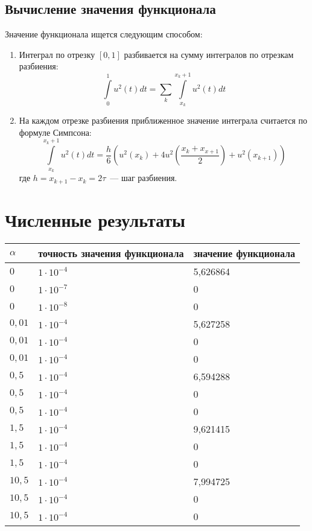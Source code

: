 \documentclass[24pt]{article}
\begin{document}
\subsection{Вычисление значения функционала}
Значение функционала ищется следующим способом:\\
\begin{enumerate}
\item 
Интеграл по отрезку $[0,1]$ разбивается на сумму интегралов по отрезкам разбиения:
$$ \int\limits_0^1 u^2(t) dt = \sum\limits_k\int\limits_{x_k}^{x_k+1}u^2(t)dt$$
\item
На каждом отрезке разбиения приближенное значение интеграла считается по формуле Симпсона:\\
$$\int\limits_{x_k}^{x_k+1}u^2(t)dt = \frac{h}{6}\left(u^2\left(x_k\right) + 4u^2\left(\frac{x_k + x_{x+1}}{2}\right)+u^2\left(x_{k+1}\right)\right)$$
где $h = x_{k+1}-x_{k} = 2\tau$~--- шаг разбиения.
\end{enumerate}
\section{Численные результаты}
\begin{tabular}[t]{||l|l|l||}
\hline
$\alpha$ & точность значения функционала & значение функционала\\
\hline\hline
$0$& $1\cdot 10^{-4}$ & 5{,}626864\\
\hline
$0$& $1\cdot 10^{-7}$ & 0\\
\hline
$0$& $1\cdot 10^{-8}$ & 0\\
\hline
$0{,}01$& $1\cdot 10^{-4}$ & 5{,}627258\\
\hline
$0{,}01$& $1\cdot 10^{-4}$ & 0\\
\hline
$0{,}01$& $1\cdot 10^{-4}$ & 0\\
\hline
$0{,}5$& $1\cdot 10^{-4}$ & 6{,}594288\\
\hline
$0{,}5$& $1\cdot 10^{-4}$ & 0\\
\hline
$0{,}5$& $1\cdot 10^{-4}$ & 0\\
\hline
$1{,}5$& $1\cdot 10^{-4}$ & 9{,}621415\\
\hline
$1{,}5$& $1\cdot 10^{-4}$ & 0\\
\hline
$1{,}5$& $1\cdot 10^{-4}$ & 0\\
\hline
$10{,}5$& $1\cdot 10^{-4}$ & 7{,}994725\\
\hline
$10{,}5$& $1\cdot 10^{-4}$ & 0\\
\hline
$10{,}5$& $1\cdot 10^{-4}$ & 0\\
\hline
\end{tabular}
\end{document}
